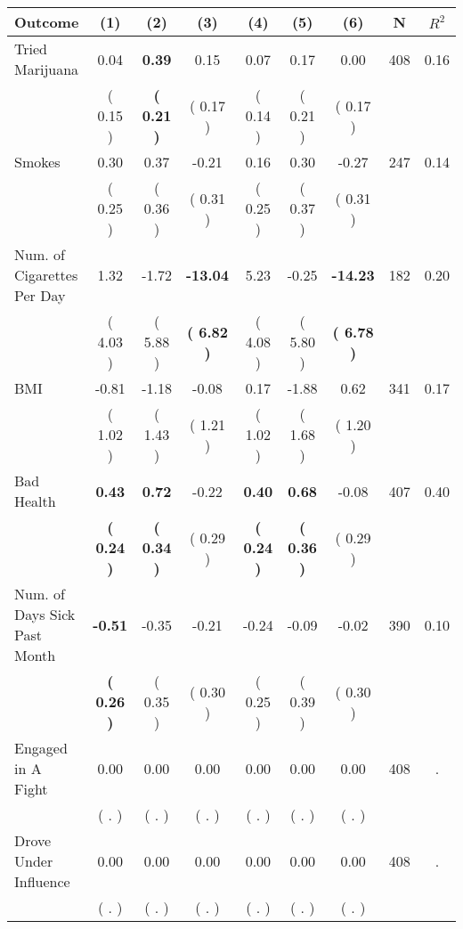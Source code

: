 \begin{tabular}{lcccccccc}
\toprule
 \textbf{Outcome} & \textbf{(1)} & \textbf{(2)} & \textbf{(3)} & \textbf{(4)} & \textbf{(5)} & \textbf{(6)} & \textbf{N} & \textbf{$ R^2$} \\
\midrule
Tried Marijuana &      0.04 & \textbf{     0.39} &      0.15 &      0.07 &      0.17 &      0.00 & 408 &       0.16 \\ 
 & (     0.15 ) & \textbf{(     0.21 )} & (     0.17 ) & (     0.14 ) & (     0.21 ) & (     0.17 ) & \\
Smokes &      0.30 &      0.37 &     -0.21 &      0.16 &      0.30 &     -0.27 & 247 &       0.14 \\ 
 & (     0.25 ) & (     0.36 ) & (     0.31 ) & (     0.25 ) & (     0.37 ) & (     0.31 ) & \\
Num. of Cigarettes Per Day &      1.32 &     -1.72 & \textbf{   -13.04} &      5.23 &     -0.25 & \textbf{   -14.23} & 182 &       0.20 \\ 
 & (     4.03 ) & (     5.88 ) & \textbf{(     6.82 )} & (     4.08 ) & (     5.80 ) & \textbf{(     6.78 )} & \\
BMI &     -0.81 &     -1.18 &     -0.08 &      0.17 &     -1.88 &      0.62 & 341 &       0.17 \\ 
 & (     1.02 ) & (     1.43 ) & (     1.21 ) & (     1.02 ) & (     1.68 ) & (     1.20 ) & \\
Bad Health & \textbf{     0.43} & \textbf{     0.72} &     -0.22 & \textbf{     0.40} & \textbf{     0.68} &     -0.08 & 407 &       0.40 \\ 
 & \textbf{(     0.24 )} & \textbf{(     0.34 )} & (     0.29 ) & \textbf{(     0.24 )} & \textbf{(     0.36 )} & (     0.29 ) & \\
Num. of Days Sick Past Month & \textbf{    -0.51} &     -0.35 &     -0.21 &     -0.24 &     -0.09 &     -0.02 & 390 &       0.10 \\ 
 & \textbf{(     0.26 )} & (     0.35 ) & (     0.30 ) & (     0.25 ) & (     0.39 ) & (     0.30 ) & \\
Engaged in A Fight &      0.00 &      0.00 &      0.00 &      0.00 &      0.00 &      0.00 & 408 &          . \\ 
 & (        . ) & (        . ) & (        . ) & (        . ) & (        . ) & (        . ) & \\
Drove Under Influence &      0.00 &      0.00 &      0.00 &      0.00 &      0.00 &      0.00 & 408 &          . \\ 
 & (        . ) & (        . ) & (        . ) & (        . ) & (        . ) & (        . ) & \\

\end{tabular}
